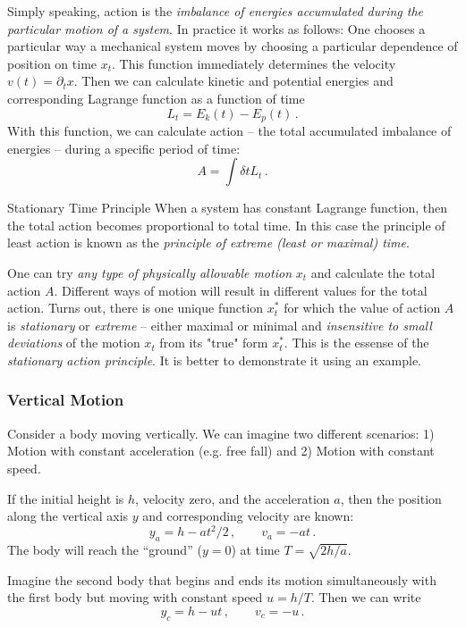 Simply speaking, action is the \emph{imbalance of energies accumulated
	during the particular motion of a system}. In practice it works as
follows: One chooses a particular way a mechanical system moves by
choosing a particular dependence of position on time $x_t$. This
function immediately determines the velocity $v(t) = \partial_t
x$. Then we can calculate kinetic and potential energies and
corresponding Lagrange function as a function of time
\[
L_t = E_k(t) - E_p(t)\,.
\]
With this function, we can calculate action -- the total accumulated
imbalance of energies -- during a specific period of time:
\[
A = \int \delta t L_t\,.
\]
\begin{mybio}{Stationary Time Principle}
	When a system has constant Lagrange function, then
	the total action becomes proportional to total time. In this case
	the principle of least action is known as the \emph{principle of
		extreme (least or maximal) time}.
\end{mybio}
One can try \emph{any type of physically allowable motion} $x_t$  and
calculate the total action $A$. Different ways of motion will result in different
values for the total action. Turns out, there is one unique function
$x^*_t$ for which the value of action $A$ is \emph{stationary} or
\emph{extreme} -- either maximal or minimal and \emph{insensitive to small
deviations} of the motion $x_t$ from its "true" form $x^*_t$. This
is the essense of the \emph{stationary action principle}. It is better
to demonstrate it using an example.

\subsubsection{Vertical Motion}
Consider a body moving vertically. We can imagine two different
scenarios: 1) Motion with constant acceleration (e.g. free fall) and
2) Motion with constant speed.

If the initial height is $h$, velocity zero, and the acceleration $a$, then the
position along the vertical axis $y$ and corresponding velocity are
known:
\[
y_a = h - at^2/2\,,\qquad v_a = -at\,.
\]
The body will reach the ``ground'' ($y=0$) at time $T=\sqrt{2h/a}$.

Imagine the second body that begins and ends its motion simultaneously
with the first body but moving with constant speed $u=h/T$. Then we
can write
\[
y_c = h - ut\,,\qquad v_c = -u\,.
\]

